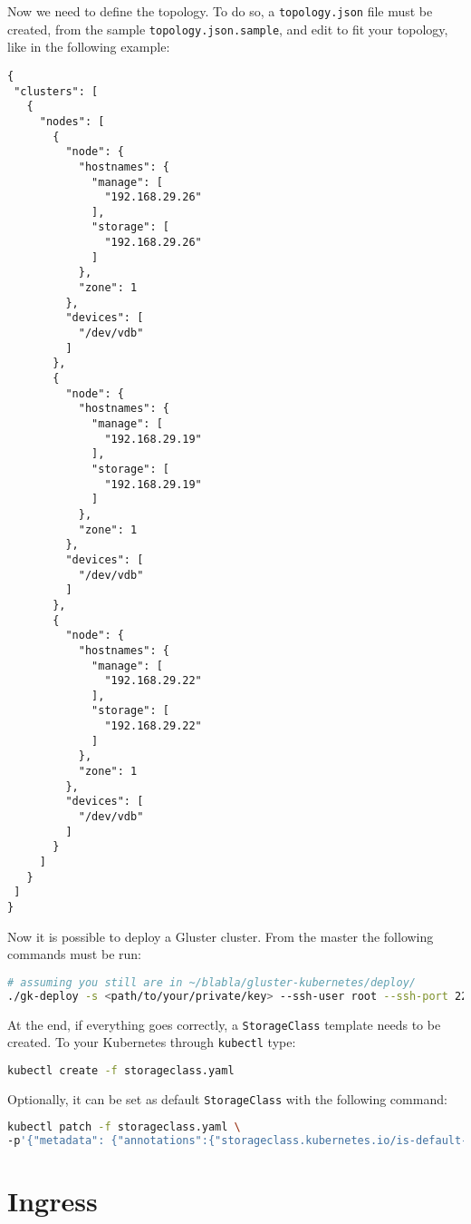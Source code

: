 Now we need to define the topology. To do so, a \texttt{topology.json}
file must be created, from the sample \texttt{topology.json.sample}, and edit to
fit your topology, like in the following example:
\begin{lstlisting}
{
 "clusters": [
   {
     "nodes": [
       {
         "node": {
           "hostnames": {
             "manage": [
               "192.168.29.26"
             ],
             "storage": [
               "192.168.29.26"
             ]
           },
           "zone": 1
         },
         "devices": [
           "/dev/vdb"
         ]
       },
       {
         "node": {
           "hostnames": {
             "manage": [
               "192.168.29.19"
             ],
             "storage": [
               "192.168.29.19"
             ]
           },
           "zone": 1
         },
         "devices": [
           "/dev/vdb"
         ]
       },
       {
         "node": {
           "hostnames": {
             "manage": [
               "192.168.29.22"
             ],
             "storage": [
               "192.168.29.22"
             ]
           },
           "zone": 1
         },
         "devices": [
           "/dev/vdb"
         ]
       }
     ]
   }
 ]
}
\end{lstlisting}

Now it is possible to deploy a Gluster cluster. From the master the following
commands must be run:

\begin{lstlisting}[language=bash]
# assuming you still are in ~/blabla/gluster-kubernetes/deploy/
./gk-deploy -s <path/to/your/private/key> --ssh-user root --ssh-port 22 topology.json -y
\end{lstlisting}

At the end, if everything goes correctly, a \texttt{StorageClass} template needs
to be created. To your Kubernetes through \texttt{kubectl} type:
\begin{lstlisting}[language=bash]
kubectl create -f storageclass.yaml
\end{lstlisting}

Optionally, it can be set as default \texttt{StorageClass} with the following
command:
\begin{lstlisting}[language=bash]
kubectl patch -f storageclass.yaml \
-p'{"metadata": {"annotations":{"storageclass.kubernetes.io/is-default-class":"true"}}}'
\end{lstlisting}

\section{Ingress}
\label{ingress}

